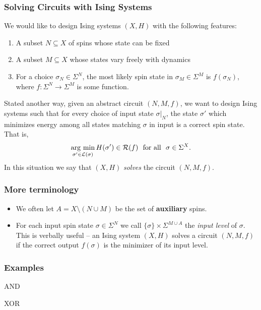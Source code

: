 \documentclass[8pt, mathserif, notheorems]{beamer}
\begin{document}
\begin{frame}[t]\frametitle{Solving Circuits with Ising Systems}
We would like to design Ising systems $(X,H)$ with the following features:

\bigskip

\begin{enumerate}[(1)]
  \item A subset $N \subseteq X$ of spins whose state can be fixed
    \bigskip

  \item A subset $M \subseteq X$ whose states vary freely with dynamics
    \bigskip

  \item For a choice $\sigma_N \in \Sigma^N$, the most likely spin state in $\sigma_M \in \Sigma^M$ is $f(\sigma_N)$, where $f: \Sigma^N \to \Sigma^M$ is some function.
    \bigskip

\end{enumerate}
Stated another way, given an abstract circuit $(N,M,f)$, we want to design Ising systems such that for every choice of input state $\sigma|_N$, the state $\sigma'$ which minimizes energy among all states matching $\sigma$ in input is a correct spin state. That is,
\begin{align*}
  \operatorname*{arg ~ min}_{\sigma' \in \mathcal{L}(\sigma)} H(\sigma') \in \mathcal{R}(f) ~ \text{ for all } ~ \sigma \in \Sigma^X.
\end{align*}
In this situation we say that $(X,H)$ \textit{solves} the circuit $(N,M,f)$.
\end{frame}
\begin{frame}[c]\frametitle{More terminology}
  \begin{itemize}
    \item We often let $A = X \setminus (N\cup M)$ be the set of \textbf{auxiliary} spins.

      \bigskip

    \item For each input spin state $\sigma \in \Sigma^N$ we call $\{\sigma\} \times \Sigma^{M \cup A}$ the \textit{input level} of $\sigma$. This is verbally useful -- an Ising system $(X,H)$ solves a circuit $(N,M,f)$ if the correct output $f(\sigma)$ is the minimizer of its input level.
  \end{itemize}
\end{frame}
\begin{frame}[t]\frametitle{Examples}
  \begin{minipage}{0.49\textwidth}
  \begin{center}
    \Large AND
  \end{center}
  \end{minipage}
  \begin{minipage}{0.49\textwidth}
  \begin{center}
    \Large XOR
  \end{center}  
  \end{minipage}
\end{frame}
\end{document}
